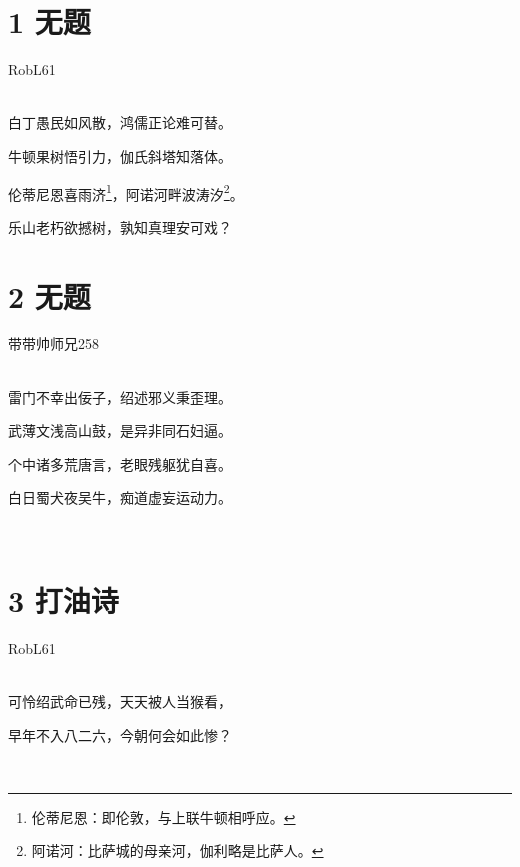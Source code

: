 \documentclass[UTF8,12pt,oneside]{ctexbook}
\begin{document}
    \section{1 无题}
    \begin{center}
        RobL61
        
        ~\\
        白丁愚民如风散，鸿儒正论难可替。
        
        牛顿果树悟引力，伽氏斜塔知落体。
        
        伦蒂尼恩喜雨济\footnote{伦蒂尼恩：即伦敦，与上联牛顿相呼应。}，阿诺河畔波涛汐\footnote{阿诺河：比萨城的母亲河，伽利略是比萨人。}。
        
        乐山老朽欲撼树，孰知真理安可戏？

    \end{center}
    
    \newpage
    
    \section{2 无题}
    \begin{center}
        带带帅师兄258
        
        ~\\
        雷门不幸出佞子，绍述邪义秉歪理。
        
        武薄文浅高山鼓，是异非同石妇逼。
        
        个中诸多荒唐言，老眼残躯犹自喜。
        
        白日蜀犬夜吴牛，痴道虚妄运动力。
        
        ~\\
        
    \end{center}
    
    \section{3 打油诗}
    \begin{center}
        RobL61
        
        ~\\
        可怜绍武命已残，天天被人当猴看，
        
        早年不入八二六，今朝何会如此惨？
        
        ~\\

    \end{center}
    
\end{document}
